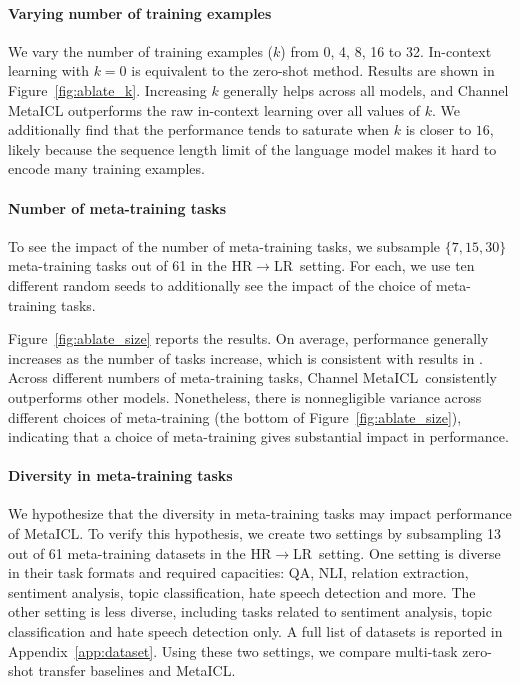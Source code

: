 \paragraph{Varying number of training examples} We vary the number of training examples ($k$) from 0, 4, 8, 16 to 32. In-context learning with $k=0$ is equivalent to the zero-shot method. Results are shown in Figure~\ref{fig:ablate_k}. Increasing $k$ generally helps across all models, and Channel MetaICL outperforms the raw in-context learning over all values of $k$. We additionally find that the performance tends to saturate when $k$ is closer to $16$, likely because the sequence length limit of the language model makes it hard to encode many training examples.

\paragraph{Number of meta-training tasks} To see the impact of the number of meta-training tasks, we subsample $\{7,15,30\}$ meta-training tasks out of 61 in the HR$\rightarrow$LR\ setting. For each, we use ten different random seeds to additionally see the impact of the choice of meta-training tasks.

Figure~\ref{fig:ablate_size} reports the results. On average, performance generally increases as the number of tasks increase, which is consistent with results in \citet{mishra2022cross,wei2022finetuned}.
Across different numbers of meta-training tasks, Channel MetaICL\ consistently outperforms other models. Nonetheless, there is nonnegligible variance across different choices of meta-training (the bottom of Figure~\ref{fig:ablate_size}), indicating that a choice of meta-training gives substantial impact in performance.

\paragraph{Diversity in meta-training tasks} We hypothesize that the diversity in meta-training tasks may impact performance of MetaICL. To verify this hypothesis, we create two settings by subsampling 13 out of 61 meta-training datasets in the HR$\rightarrow$LR\ setting. One setting is diverse in their task formats and required capacities: QA, NLI, relation extraction, sentiment analysis, topic classification, hate speech detection and more. The other setting is less diverse, including tasks related to sentiment analysis, topic classification and hate speech detection only. A full list of datasets is reported in Appendix~\ref{app:dataset}. Using these two settings, we compare multi-task zero-shot transfer baselines and MetaICL.

